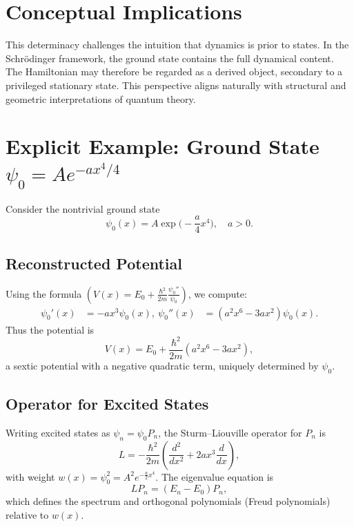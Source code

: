 \documentclass[11pt]{article}
\begin{document}
\section{Conceptual Implications}
This determinacy challenges the intuition that dynamics is prior to states. In the Schr\"odinger framework, the ground state contains the full dynamical content. The Hamiltonian may therefore be regarded as a derived object, secondary to a privileged stationary state. This perspective aligns naturally with structural and geometric interpretations of quantum theory.


\section{Explicit Example: Ground State $\psi_0 = A e^{-a x^4/4}$}

Consider the nontrivial ground state
\begin{equation}
\psi_0(x) = A \exp\Big(-\frac{a}{4} x^4\Big), \quad a>0.
\end{equation}

\subsection{Reconstructed Potential}
Using the formula
$(V(x) = E_0 + \frac{\hbar^2}{2m} \frac{\psi_0''}{\psi_0})$, we compute:
\begin{align*}
\psi_0'(x) &= -a x^3 \psi_0(x), \
\psi_0''(x) &= (a^2 x^6 - 3 a x^2) \psi_0(x).
\end{align*}
Thus the potential is
\begin{equation}
V(x) = E_0 + \frac{\hbar^2}{2m} (a^2 x^6 - 3 a x^2),
\end{equation}
a sextic potential with a negative quadratic term, uniquely determined by $\psi_0$.

\subsection{Operator for Excited States}
Writing excited states as $\psi_n = \psi_0 P_n$, the Sturm--Liouville operator for $P_n$ is
\begin{equation}
L = -\frac{\hbar^2}{2m} \left( \frac{d^2}{dx^2} + 2 a x^3 \frac{d}{dx} \right),
\end{equation}
with weight $w(x) = \psi_0^2 = A^2 e^{- \frac{a}{2} x^4}$. The eigenvalue equation is
\begin{equation}
L P_n = (E_n - E_0) P_n,
\end{equation}
which defines the spectrum and orthogonal polynomials (Freud polynomials) relative to $w(x)$.
\end{document}
